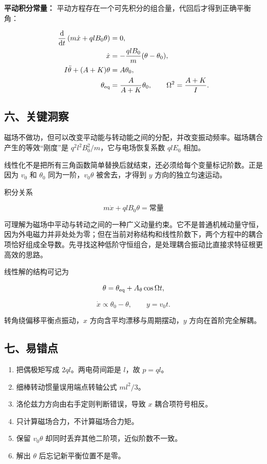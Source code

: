 \documentclass[12pt,a4paper,UTF8]{ctexart}
\newcommand{\tightlist}{\setlength{\itemsep}{0pt}\setlength{\parskip}{0pt}}
\begin{document}
\textbf{平动积分常量：}
平动方程存在一个可先积分的组合量，代回后才得到正确平衡角：

\[\begin{aligned}
\frac{\mathrm d}{\mathrm dt}
\left(m\dot x+qlB_0\theta\right)&=0,\\
\dot x&=-\frac{qlB_0}{m}(\theta-\theta_0),\\
I\ddot\theta+(A+K)\theta&=A\theta_0,\\
\theta_{\rm eq}&=\frac{A}{A+K}\theta_0,
\qquad \Omega^2=\frac{A+K}{I}.
\end{aligned}\]

\subsection{六、关键洞察}\label{ux516dux5173ux952eux6d1eux5bdf-3}

磁场不做功，但可以改变平动能与转动能之间的分配，并改变振动频率。磁场耦合产生的等效``刚度''是
\(q^2l^2B_0^2/m\)，它与电场恢复系数 \(qlE_0\) 相加。

线性化不是把所有三角函数简单替换后就结束，还必须给每个变量标记阶数。正是因为
\(v_0\) 和 \(\theta_0\) 同为一阶，\(v_0\theta\) 被舍去，才得到 \(y\)
方向的独立匀速运动。

积分关系

\[m\dot x+qlB_0\theta=\text{常量}\]

可理解为磁场中平动与转动之间的一种广义动量约束。它不是普通机械动量守恒，因为外电磁力并非处处为零；但在当前对称结构和线性阶数下，两个方程中的耦合项恰好组成全导数。先寻找这种低阶守恒组合，是处理耦合振动比直接求特征根更高效的思路。

线性解的结构可记为

\[\theta=\theta_{\rm eq}+A_\theta\cos\Omega t,\]

\[\dot x\propto\theta_0-\theta,
\qquad y=v_0t.\]

转角绕偏移平衡点振动，\(x\) 方向含平均漂移与周期摆动，\(y\)
方向在首阶完全解耦。

\subsection{七、易错点}\label{ux4e03ux6613ux9519ux70b9-3}

\begin{enumerate}
\def\labelenumi{\arabic{enumi}.}
\tightlist
\item
  把偶极矩写成 \(2ql\)。两电荷间距是 \(l\)，故 \(p=ql\)。
\item
  细棒转动惯量误用端点转轴公式 \(ml^2/3\)。
\item
  洛伦兹力方向由右手定则判断错误，导致 \(x\) 耦合项符号相反。
\item
  只计算磁场合力，不计算磁场合力矩。
\item
  保留 \(v_0\theta\) 却同时丢弃其他二阶项，近似阶数不一致。
\item
  解出 \(\theta\) 后忘记新平衡位置不是零。
\end{enumerate}
\end{document}
